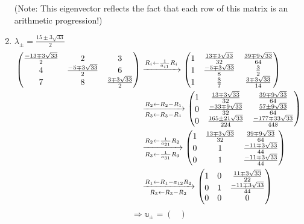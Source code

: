 \begin{enumerate}[wide, labelindent = 0pt, label = (\roman*)]
(Note: This eigenvector reflects the fact that each row of this matrix is an arithmetic progression!)

\item $\lambda_\pm = \frac{15 \pm 3\sqrt{33}}{2}$
\begin{align*}
    \begin{pmatrix}
        \frac{-13 \mp 3\sqrt{33}}{2} & 2 & 3 \\
        4 & \frac{-5 \mp 3\sqrt{33}}{2} & 6 \\
        7 & 8 & \frac{3 \mp 3\sqrt{33}}{2}
    \end{pmatrix}
    &\xrightarrow{R_i \leftarrow \frac{1}{a_{i1}} R_i} \begin{pmatrix}
        1 & \frac{13 \mp 3\sqrt{33}}{32} & \frac{39 \mp 9\sqrt{33}}{64} \\
        1 & \frac{-5 \mp 3\sqrt{33}}{8} & \frac{3}{2} \\
        1 & \frac{8}{7} & \frac{3 \mp 3\sqrt{33}}{14}
    \end{pmatrix} \\
    &\xrightarrow[R_3 \leftarrow R_3 - R_1]{R_2 \leftarrow R_2 - R_1} \begin{pmatrix}
        1 & \frac{13 \mp 3\sqrt{33}}{32} & \frac{39 \mp 9\sqrt{33}}{64} \\
        0 & \frac{-33 \mp 9\sqrt{33}}{32} & \frac{57 \pm 9\sqrt{33}}{64} \\
        0 & \frac{165 \pm 21\sqrt{33}}{224} & \frac{-177 \mp 33\sqrt{33}}{448}
    \end{pmatrix} \\
    &\xrightarrow[R_3 \leftarrow \frac{1}{a_{31}} R_3]{R_2 \leftarrow \frac{1}{a_{21}} R_2} \begin{pmatrix}
        1 & \frac{13 \mp 3\sqrt{33}}{32} & \frac{39 \mp 9\sqrt{33}}{64} \\
        0 & 1 & \frac{-11 \mp 3\sqrt{33}}{44} \\
        0 & 1 & \frac{-11 \mp 3\sqrt{33}}{44}
    \end{pmatrix} \\
    &\xrightarrow[R_3 \leftarrow R_3 - R_2]{R_1 \leftarrow R_1 - a_{12} R_2} \begin{pmatrix}
        1 & 0 & \frac{11 \mp 3\sqrt{33}}{22} \\
        0 & 1 & \frac{-11 \mp 3\sqrt{33}}{44} \\
        0 & 0 & 0
    \end{pmatrix}
\end{align*}
\[
    \Rightarrow \mathbb{u}_\pm = \begin{pmatrix}

\end{pmatrix}\]
\end{enumerate}
